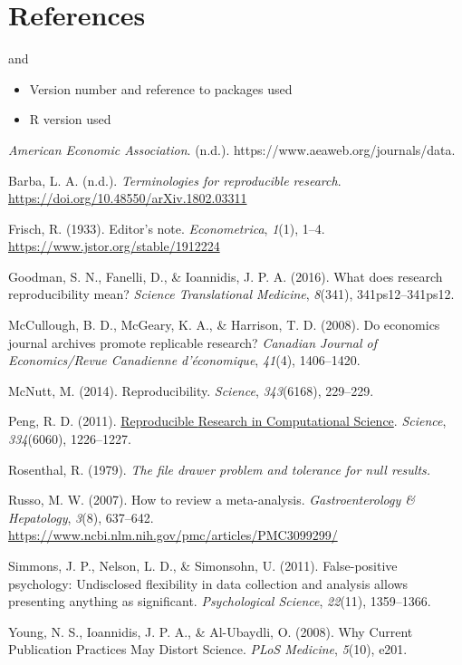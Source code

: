 \documentclass[
  british,
  a4paper,
]{article}
\newlength{\cslhangindent}
\newenvironment{CSLReferences}[2] %
 {\begin{list}{}{%
  \setlength{\itemindent}{0pt}
  \setlength{\leftmargin}{0pt}
  \setlength{\parsep}{0pt}
  \ifodd #1
   \setlength{\leftmargin}{\cslhangindent}
   \setlength{\itemindent}{-1\cslhangindent}
  \fi
  \setlength{\itemsep}{#2\baselineskip}}}
 {\end{list}}
\providecommand{\tightlist}{%
  \setlength{\itemsep}{0pt}\setlength{\parskip}{0pt}}
\begin{document}
\section{References}\label{references}

and

\begin{itemize}
\tightlist
\item
  Version number and reference to packages used
\item
  R version used
\end{itemize}

\label{refs}
\begin{CSLReferences}{1}{0}
\emph{American {Economic Association}}. (n.d.).
https://www.aeaweb.org/journals/data.

Barba, L. A. (n.d.). \emph{Terminologies for reproducible research}.
\url{https://doi.org/10.48550/arXiv.1802.03311}

Frisch, R. (1933). Editor's note. \emph{Econometrica}, \emph{1}(1),
1--4. \url{https://www.jstor.org/stable/1912224}

Goodman, S. N., Fanelli, D., \& Ioannidis, J. P. A. (2016). What does
research reproducibility mean? \emph{Science Translational Medicine},
\emph{8}(341), 341ps12--341ps12.

McCullough, B. D., McGeary, K. A., \& Harrison, T. D. (2008). Do
economics journal archives promote replicable research? \emph{Canadian
Journal of Economics/Revue Canadienne d'{é}conomique}, \emph{41}(4),
1406--1420.

McNutt, M. (2014). Reproducibility. \emph{Science}, \emph{343}(6168),
229--229.

Peng, R. D. (2011).
\href{https://www.ncbi.nlm.nih.gov/pubmed/22144613}{Reproducible
{Research} in {Computational Science}}. \emph{Science},
\emph{334}(6060), 1226--1227.

Rosenthal, R. (1979). \emph{The file drawer problem and tolerance for
null results.}

Russo, M. W. (2007). How to review a meta-analysis.
\emph{Gastroenterology \& Hepatology}, \emph{3}(8), 637--642.
\url{https://www.ncbi.nlm.nih.gov/pmc/articles/PMC3099299/}

Simmons, J. P., Nelson, L. D., \& Simonsohn, U. (2011). False-positive
psychology: {Undisclosed} flexibility in data collection and analysis
allows presenting anything as significant. \emph{Psychological Science},
\emph{22}(11), 1359--1366.

Young, N. S., Ioannidis, J. P. A., \& Al-Ubaydli, O. (2008). Why
{Current Publication Practices May Distort Science}. \emph{PLoS
Medicine}, \emph{5}(10), e201.

\end{CSLReferences}
\end{document}
